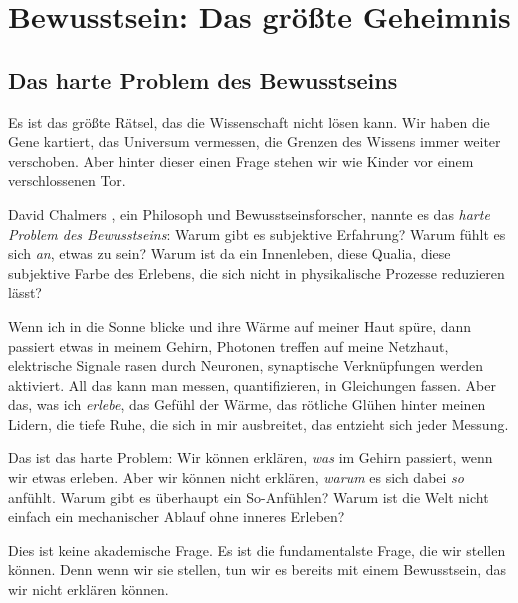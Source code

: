 
\chapter{Bewusstsein: Das größte Geheimnis}

\section{Das harte Problem des Bewusstseins}

Es ist das größte Rätsel, das die Wissenschaft nicht lösen kann. Wir haben die Gene kartiert, das Universum vermessen, die Grenzen des Wissens immer weiter verschoben. Aber hinter dieser einen Frage stehen wir wie Kinder vor einem verschlossenen Tor.

David Chalmers \cite{Chalmers1995}, ein Philosoph und Bewusstseinsforscher, nannte es das \emph{harte Problem des Bewusstseins}: Warum gibt es subjektive Erfahrung? Warum fühlt es sich \emph{an}, etwas zu sein? Warum ist da ein \glqq Innenleben\grqq{}, diese Qualia, diese subjektive Farbe des Erlebens, die sich nicht in physikalische Prozesse reduzieren lässt?

Wenn ich in die Sonne blicke und ihre Wärme auf meiner Haut spüre, dann passiert etwas in meinem Gehirn, Photonen treffen auf meine Netzhaut, elektrische Signale rasen durch Neuronen, synaptische Verknüpfungen werden aktiviert. All das kann man messen, quantifizieren, in Gleichungen fassen. Aber das, was ich \emph{erlebe}, das Gefühl der Wärme, das rötliche Glühen hinter meinen Lidern, die tiefe Ruhe, die sich in mir ausbreitet, das entzieht sich jeder Messung.

Das ist das harte Problem: Wir können erklären, \emph{was} im Gehirn passiert, wenn wir etwas erleben. Aber wir können nicht erklären, \emph{warum} es sich dabei \emph{so} anfühlt. Warum gibt es überhaupt ein \glqq So-Anfühlen\grqq{}? Warum ist die Welt nicht einfach ein mechanischer Ablauf ohne inneres Erleben?

Dies ist keine akademische Frage. Es ist die fundamentalste Frage, die wir stellen können. Denn wenn wir sie stellen, tun wir es bereits mit einem Bewusstsein, das wir nicht erklären können.

